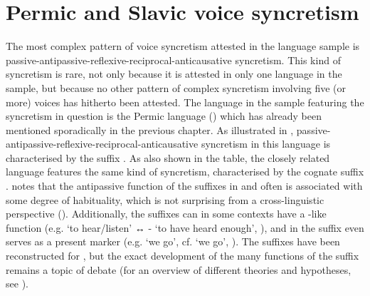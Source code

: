 \section{Permic and Slavic voice syncretism} \label{sec:complex-syncretism:multiplex}
The most complex pattern of voice syncretism attested in the language sample is passive-antipassive-reflexive-reciprocal-anticausative syncretism. This kind of syncretism is rare, not only because it is attested in only one language in the sample, but because no other pattern of complex syncretism involving five (or more) voices has hitherto been attested. The language in the sample featuring the syncretism in question is the Permic language  () which has already been mentioned sporadically in the previous chapter. As illustrated in , passive-antipassive-reflexive-reciprocal-anticausative syncretism in this language is characterised by the suffix . As also shown in the table, the closely related language  features the same kind of syncretism, characterised by the cognate suffix . \cite[284]{bartens:2000} notes that the antipassive function of the suffixes in  and  often is associated with some degree of habituality, which is not surprising from a cross-linguistic perspective (\citealt{polinsky:2017}). Additionally, the suffixes can in some contexts have a -like function (e.g.   ‘to hear/listen’ ↔ - ‘to have heard enough’, \citealt[285]{bartens:2000}), and in  the suffix  even serves as a present  marker (e.g.   ‘we go’, cf.   ‘we go’, \citealt[179ff.]{bartens:2000}). The suffixes have been reconstructed  for , but the exact development of the many functions of the suffix remains a topic of debate (for an overview of different theories and hypotheses, see \citealt[168ff.]{kozmacs:2003}).

